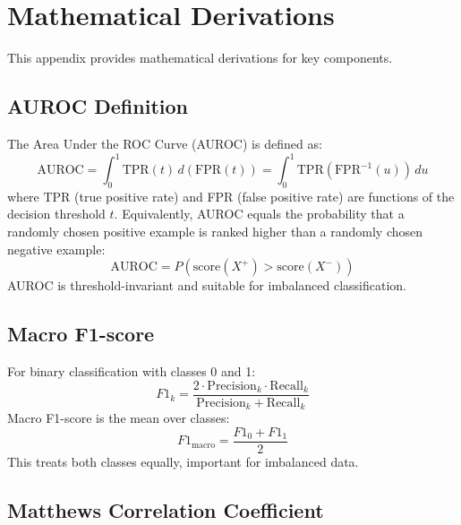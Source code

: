\chapter{Mathematical Derivations}
\label{app:math}

This appendix provides mathematical derivations for key components.

\section{AUROC Definition}

The Area Under the ROC Curve (AUROC) is defined as:
\begin{equation}
\text{AUROC} = \int_0^1 \text{TPR}(t) \, d(\text{FPR}(t)) = \int_0^1 \text{TPR}(\text{FPR}^{-1}(u)) \, du
\end{equation}
where TPR (true positive rate) and FPR (false positive rate) are functions of the decision threshold $t$. Equivalently, AUROC equals the probability that a randomly chosen positive example is ranked higher than a randomly chosen negative example:
\begin{equation}
\text{AUROC} = P(\text{score}(X^+) > \text{score}(X^-))
\end{equation}
AUROC is threshold-invariant and suitable for imbalanced classification.

\section{Macro F1-score}

For binary classification with classes 0 and 1:
\begin{equation}
F1_k = \frac{2 \cdot \text{Precision}_k \cdot \text{Recall}_k}{\text{Precision}_k + \text{Recall}_k}
\end{equation}
Macro F1-score is the mean over classes:
\begin{equation}
F1_{\text{macro}} = \frac{F1_0 + F1_1}{2}
\end{equation}
This treats both classes equally, important for imbalanced data.

\section{Matthews Correlation Coefficient}

